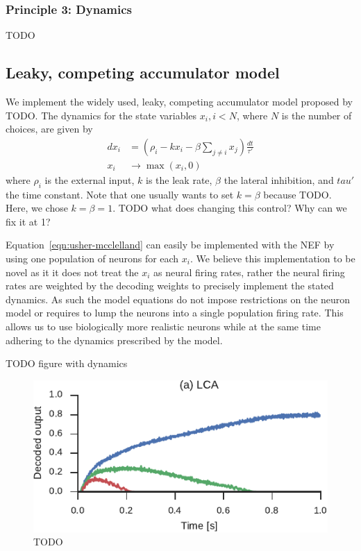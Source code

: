 \documentclass[10pt,letterpaper]{article}
\begin{document}
\subsubsection{Principle 3: Dynamics}
TODO

\subsection{Leaky, competing accumulator model}
We implement the widely used, leaky, competing accumulator model proposed by 
TODO\@. The dynamics for the state variables $x_i, i < N$, where $N$ is the 
number of choices, are given by
\begin{equation}\label{eqn:usher-mcclelland}
    \begin{split}
    dx_i &= \left(\rho_i - kx_i - \beta \sum_{j \neq i} x_j\right) 
    \frac{dt}{\tau'} \\
    x_i &\rightarrow \max(x_i, 0)
    \end{split}
\end{equation}
where $\rho_i$ is the external input, $k$ is the leak rate, $\beta$ the lateral 
inhibition, and $tau'$ the time constant. Note that one usually wants to set $k 
= \beta$ because TODO\@. Here, we chose $k = \beta = 1$. TODO what does changing 
this control? Why can we fix it at 1?

Equation~\ref{eqn:usher-mcclelland} can easily be implemented with the NEF by 
using one population of neurons for each $x_i$.  We believe this implementation 
to be novel as it it does not treat the $x_i$ as neural firing rates, rather the 
neural firing rates are weighted by the decoding weights to precisely implement 
the stated dynamics. As such the model equations do not impose restrictions on 
the neuron model or requires to lump the neurons into a single population firing 
rate. This allows us to use biologically more realistic neurons while at the 
same time adhering to the dynamics prescribed by the model.

TODO figure with dynamics
\begin{figure}
    \centering
    \includegraphics{figures/usher-mcclelland}
    \caption{TODO}\label{fig:usher-mcclelland}
\end{figure}
\end{document}
